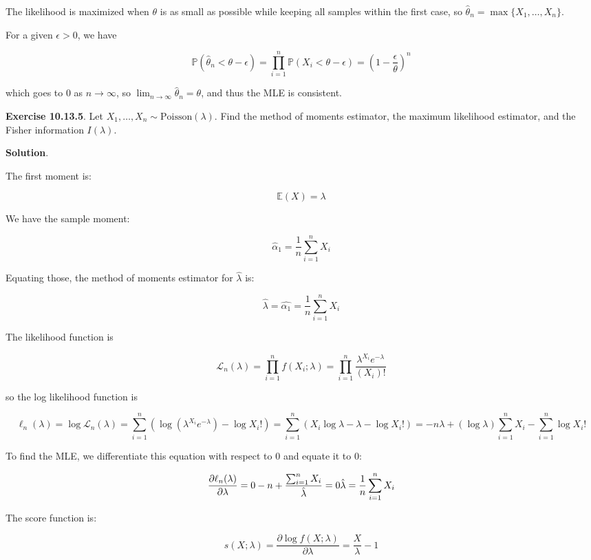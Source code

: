The likelihood is maximized when \(\theta\) is as small as possible
while keeping all samples within the first case, so
\(\hat{\theta}_n = \max \{X_1, \dots, X_n \}\).

For a given \(\epsilon > 0\), we have

\[\mathbb{P}(\hat{\theta}_n < \theta - \epsilon) = \prod_{i=1}^n \mathbb{P}(X_i < \theta - \epsilon) = \left(1 - \frac{\epsilon}{\theta} \right)^n\]

which goes to 0 as \(n \rightarrow \infty\), so
\(\lim _{n \rightarrow \infty} \hat{\theta}_n = \theta\), and thus the
MLE is consistent.

\textbf{Exercise 10.13.5}. Let
\(X_1, \dots, X_n \sim \text{Poisson}(\lambda)\). Find the method of
moments estimator, the maximum likelihood estimator, and the Fisher
information \(I(\lambda)\).

\textbf{Solution}.

The first moment is:

\[\mathbb{E}(X) = \lambda\]

We have the sample moment:

\[\hat{\alpha}_1 = \frac{1}{n} \sum_{i=1}^n X_i\]

Equating those, the method of moments estimator for \(\hat{\lambda}\)
is:

\[\hat{\lambda} = \hat{\alpha_1} = \frac{1}{n} \sum_{i=1}^n X_i\]

The likelihood function is

\[\mathcal{L}_n(\lambda) = \prod_{i=1}^n f(X_i; \lambda) = \prod_{i=1}^n \frac{\lambda^{X_i}e^{-\lambda}}{(X_i)!}\]

so the log likelihood function is

\[\ell_n(\lambda) = \log \mathcal{L}_n(\lambda) = \sum_{i=1}^n (\log(\lambda^{X_i}e^{-\lambda}) - \log X_i!)
= \sum_{i=1}^n (X_i \log \lambda - \lambda - \log X_i!)
= -n \lambda + (\log \lambda) \sum_{i=1}^n X_i - \sum_{i=1}^n \log X_i!
\]

To find the MLE, we differentiate this equation with respect to 0 and
equate it to 0:

\[ \frac{\partial \ell_n(\lambda)}{\partial \lambda} = 0 \\
-n + \frac{\sum_{i=1}^n X_i}{\hat{\lambda}} = 0 \\
\hat{\lambda} = \frac{1}{n} \sum_{i=1}^n X_i
\]

The score function is:

\[ s(X; \lambda) = \frac{\partial \log f(X; \lambda)}{\partial \lambda} = \frac{X}{\lambda} - 1\]

